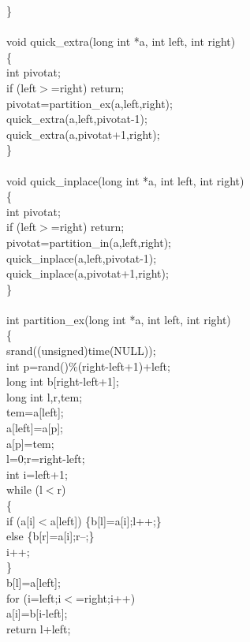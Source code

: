 \documentclass{article}
\begin{document}
\}\\
\\
void quick\_extra(long int *a, int left, int right)\\
\{\\
    int pivotat;\\
    if (left$>$=right) return;\\
    pivotat=partition\_ex(a,left,right);\\
    quick\_extra(a,left,pivotat-1);\\
    quick\_extra(a,pivotat+1,right);\\
\}\\
\\
void quick\_inplace(long int *a, int left, int right)\\
\{\\
    int pivotat;\\
    if (left$>$=right) return;\\
    pivotat=partition\_in(a,left,right);\\
    quick\_inplace(a,left,pivotat-1);\\
    quick\_inplace(a,pivotat+1,right);\\
\}\\
\\
int partition\_ex(long int *a, int left, int right)\\
\{\\
    srand((unsigned)time(NULL));\\
    int p=rand()\%(right-left+1)+left;\\
    long int b[right-left+1];\\
    long int l,r,tem;\\
    tem=a[left];\\
    a[left]=a[p];\\
    a[p]=tem;\\
    l=0;r=right-left;\\
    int i=left+1;\\
    while (l$<$r)\\
    \{\\
        if (a[i]$<$a[left]) \{b[l]=a[i];l++;\}\\
        else \{b[r]=a[i];r--;\}\\
        i++;\\
    \}\\
    b[l]=a[left];\\
    for (i=left;i$<$=right;i++)\\
        a[i]=b[i-left];\\
    return l+left;\\
\end{document}

